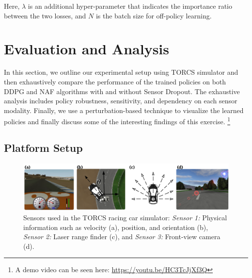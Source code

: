 \documentclass[../thesis.tex]{subfiles}
\begin{document}
Here, $\lambda$ is an additional hyper-parameter that indicates the importance ratio between the two losses, and $N$ is the batch size for off-policy learning.





\section{Evaluation and Analysis} \label{sec:mdrl-results}
In this section, we outline our experimental setup using TORCS simulator and then exhaustively compare the performance of the trained policies on both DDPG and NAF algorithms with and without Sensor Dropout. The exhaustive analysis includes policy robustness, sensitivity, and dependency on each sensor modality. Finally, we use a perturbation-based technique to visualize the learned policies and finally discuss some of the interesting findings of this exercise.
\footnote{A demo video can be seen here: \url{https://youtu.be/HC3TcJjXf3Q}}

\subsection{Platform Setup} \label{sec:platform}

\begin{figure}[t]
	\centering
	\vskip 0.2in
	\includegraphics[width=\columnwidth]{./MultimodalDRL/fig/TORCS.png} %
	\caption{Sensors used in the TORCS racing car simulator: \textit{Sensor 1:} Physical information such as velocity (a), position, and orientation (b), \textit{Sensor 2:} Laser range finder (c), and \textit{Sensor 3:} Front-view camera (d).}
	\label{fig:TORCS}
\end{figure} 
\end{document}
